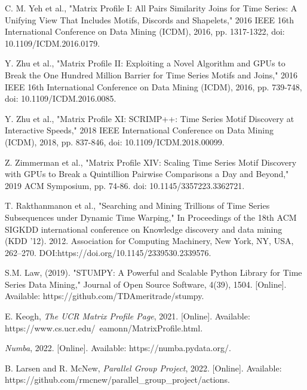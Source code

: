 \documentclass[conference]{IEEEtran}
\begin{document}
\begin{thebibliography}{9}  

 C. M. Yeh et al., "Matrix Profile I: All Pairs Similarity Joins for Time Series: A Unifying View That Includes Motifs, Discords and Shapelets," 2016 IEEE 16th International Conference on Data Mining (ICDM), 2016, pp. 1317-1322, doi: 10.1109/ICDM.2016.0179.

 Y. Zhu et al., "Matrix Profile II: Exploiting a Novel Algorithm and GPUs to Break the One Hundred Million Barrier for Time Series Motifs and Joins," 2016 IEEE 16th International Conference on Data Mining (ICDM), 2016, pp. 739-748, doi: 10.1109/ICDM.2016.0085.

 Y. Zhu et al., "Matrix Profile XI: SCRIMP++: Time Series Motif Discovery at Interactive Speeds," 2018 IEEE International Conference on Data Mining (ICDM), 2018, pp. 837-846, doi: 10.1109/ICDM.2018.00099.

 Z. Zimmerman et al., "Matrix Profile XIV: Scaling Time Series Motif Discovery with GPUs to Break a Quintillion Pairwise Comparisons a Day and Beyond," 2019 ACM Symposium, pp. 74-86. doi: 10.1145/3357223.3362721. 

 T. Rakthanmanon et al., "Searching and Mining Trillions of Time Series Subsequences under Dynamic Time Warping," In Proceedings of the 18th ACM SIGKDD international conference on Knowledge discovery and data mining (KDD '12). 2012. Association for Computing Machinery, New York, NY, USA, 262–270. DOI:https://doi.org/10.1145/2339530.2339576.

 S.M. Law, (2019). "STUMPY: A Powerful and Scalable Python Library for Time Series Data Mining," Journal of Open Source Software, 4(39), 1504. [Online]. Available: https://github.com/TDAmeritrade/stumpy.

 E. Keogh, \emph{The UCR Matrix Profile Page}, 2021. [Online]. Available: https://www.cs.ucr.edu/~eamonn/MatrixProfile.html.

 \emph{Numba}, 2022. [Online]. Available: https://numba.pydata.org/.

 B. Larsen and R. McNew, \emph{Parallel Group Project}, 2022. [Online]. Available:  https://github.com/rmcnew/parallel\_group\_project/actions.

\end{thebibliography}
\end{document}
